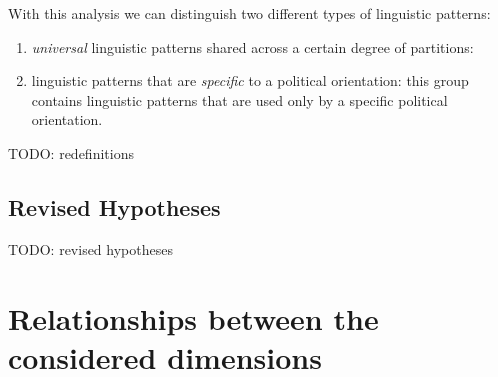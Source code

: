 With this analysis we can distinguish two different types of linguistic patterns:

\begin{enumerate}
    \item \emph{universal} linguistic patterns shared across a certain degree of partitions:
    \item linguistic patterns that are \emph{specific} to a political orientation: this group contains linguistic patterns that are used only by a specific political orientation.
\end{enumerate}


TODO: redefinitions





\subsection{Revised Hypotheses}

TODO: revised hypotheses


\section{Relationships between the considered dimensions}


